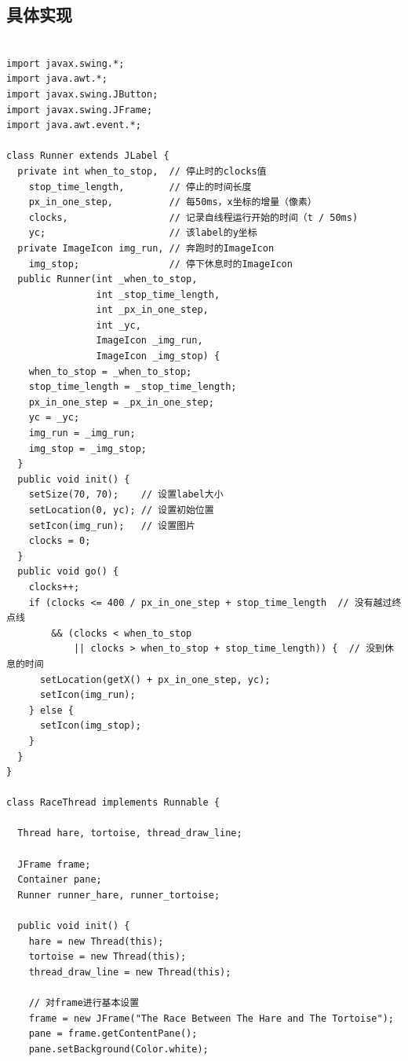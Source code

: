\documentclass[11pt, a4paper]{article}
\begin{document}
\begin{CJK*}{UTF8}{gbsn}
  
  \section{具体实现}
  \begin{lstlisting}

import javax.swing.*;
import java.awt.*;
import javax.swing.JButton;
import javax.swing.JFrame;
import java.awt.event.*;

class Runner extends JLabel {
  private int when_to_stop,  // 停止时的clocks值
    stop_time_length,        // 停止的时间长度
    px_in_one_step,          // 每50ms，x坐标的增量（像素）
    clocks,                  // 记录自线程运行开始的时间（t / 50ms)
    yc;                      // 该label的y坐标
  private ImageIcon img_run, // 奔跑时的ImageIcon
    img_stop;                // 停下休息时的ImageIcon
  public Runner(int _when_to_stop,
                int _stop_time_length,
                int _px_in_one_step,
                int _yc,
                ImageIcon _img_run,
                ImageIcon _img_stop) {
    when_to_stop = _when_to_stop;
    stop_time_length = _stop_time_length;
    px_in_one_step = _px_in_one_step;
    yc = _yc;
    img_run = _img_run;
    img_stop = _img_stop;
  }
  public void init() {
    setSize(70, 70);    // 设置label大小
    setLocation(0, yc); // 设置初始位置
    setIcon(img_run);   // 设置图片
    clocks = 0;          
  }
  public void go() {
    clocks++;
    if (clocks <= 400 / px_in_one_step + stop_time_length  // 没有越过终点线
        && (clocks < when_to_stop                          
            || clocks > when_to_stop + stop_time_length)) {  // 没到休息的时间
      setLocation(getX() + px_in_one_step, yc);
      setIcon(img_run);
    } else {
      setIcon(img_stop);
    } 
  }
}

class RaceThread implements Runnable {
  
  Thread hare, tortoise, thread_draw_line;

  JFrame frame;
  Container pane;
  Runner runner_hare, runner_tortoise;
  
  public void init() {
    hare = new Thread(this);
    tortoise = new Thread(this);
    thread_draw_line = new Thread(this);

    // 对frame进行基本设置
    frame = new JFrame("The Race Between The Hare and The Tortoise");
    pane = frame.getContentPane();
    pane.setBackground(Color.white);


\end{lstlisting}
\end{CJK*}
\end{document}
